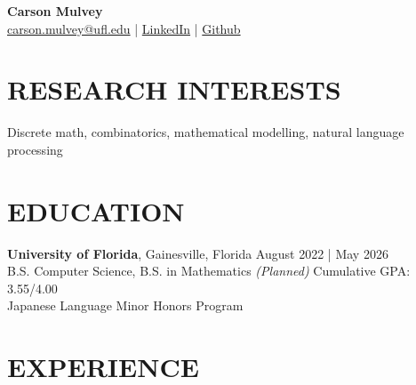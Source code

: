 \documentclass[a4paper,9pt]{extarticle}
\begin{document}
\pagestyle{fancy}
\renewcommand{\headrulewidth}{0pt}
\fancyhead{}
\thispagestyle{empty} %

\begin{flushleft}
\textbf{\LARGE Carson Mulvey}\\[2pt] %
\href{mailto:carson.mulvey@ufl.edu}{carson.mulvey@ufl.edu} | \href{https://www.linkedin.com/in/carson-mulvey}{LinkedIn} | \href{https://github.com/heyuncle}{Github} %
\end{flushleft}

\section*{RESEARCH INTERESTS}
\noindent
Discrete math, combinatorics, mathematical modelling, natural language processing
\section*{EDUCATION}
\noindent
\textbf{University of Florida}, Gainesville, Florida \hfill August 2022 | May 2026\\ %
B.S. Computer Science, B.S. in Mathematics \textit{(Planned)} 
\hfill Cumulative GPA: 3.55/4.00 \\
Japanese Language Minor
 \hfill Honors Program

\section*{EXPERIENCE}
\end{document}

